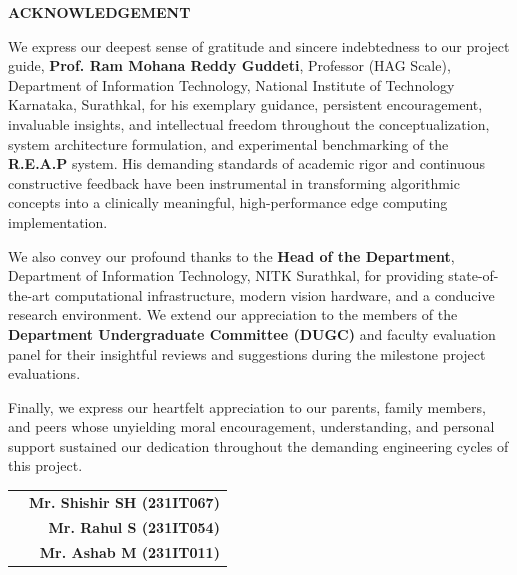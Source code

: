 \documentclass[12pt]{report}
\begin{document}
\begin{center}
    \textbf{{\Large ACKNOWLEDGEMENT}}\\
    \thispagestyle{empty}
\end{center}
\vspace{1.0em}

We express our deepest sense of gratitude and sincere indebtedness to our project guide, \textbf{Prof. Ram Mohana Reddy Guddeti}, Professor (HAG Scale), Department of Information Technology, National Institute of Technology Karnataka, Surathkal, for his exemplary guidance, persistent encouragement, invaluable insights, and intellectual freedom throughout the conceptualization, system architecture formulation, and experimental benchmarking of the \textbf{R.E.A.P} system. His demanding standards of academic rigor and continuous constructive feedback have been instrumental in transforming algorithmic concepts into a clinically meaningful, high-performance edge computing implementation.

We also convey our profound thanks to the \textbf{Head of the Department}, Department of Information Technology, NITK Surathkal, for providing state-of-the-art computational infrastructure, modern vision hardware, and a conducive research environment. We extend our appreciation to the members of the \textbf{Department Undergraduate Committee (DUGC)} and faculty evaluation panel for their insightful reviews and suggestions during the milestone project evaluations.

Finally, we express our heartfelt appreciation to our parents, family members, and peers whose unyielding moral encouragement, understanding, and personal support sustained our dedication throughout the demanding engineering cycles of this project.

\vspace{2.5em}
\noindent\begin{tabularx}{\textwidth}{Xr}
    & \textbf{Mr. Shishir SH (231IT067)}\\
    & \textbf{Mr. Rahul S (231IT054)}\\
    & \textbf{Mr. Ashab M (231IT011)}
\end{tabularx}
\clearpage

\hypersetup{pageanchor=true}
\setcounter{page}{1}
\end{document}
